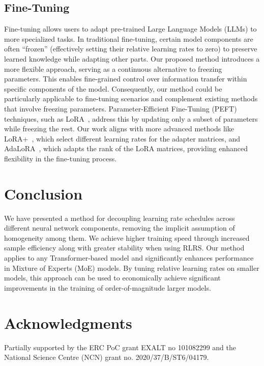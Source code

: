 \documentclass{article} %
\newcommand{\jl}[1]{\textcolor{green}{[JL: #1]}}
\begin{document}
    \subsection{Fine-Tuning}
    Fine-tuning allows users to adapt pre-trained Large Language Models (LLMs) to more specialized tasks. In traditional fine-tuning, certain model components are often ``frozen'' (effectively setting their relative learning rates to zero) to preserve learned knowledge while adapting other parts. Our proposed method introduces a more flexible approach, serving as a continuous alternative to freezing parameters. This enables fine-grained control over information transfer within specific components of the model. Consequently, our method could be particularly applicable to fine-tuning scenarios and complement existing methods that involve freezing parameters. Parameter-Efficient Fine-Tuning (PEFT) techniques, such as LoRA~\citep{hu2021lora}, address this by updating only a subset of parameters while freezing the rest. Our work aligns with more advanced methods like LoRA+~\citep{hayou2024lora+}, which select different learning rates for the adapter matrices, and AdaLoRA~\citep{zhang2023adalora}, which adapts the rank of the LoRA matrices, providing enhanced flexibility in the fine-tuning process.


    \section{Conclusion}

    We have presented a method for decoupling learning rate schedules across different neural network components, removing the implicit assumption of homogeneity among them. We achieve higher training speed through increased sample efficiency along with greater stability when using RLRS.
    Our method applies to any Transformer-based model and significantly enhances performance in Mixture of Experts (MoE) models. By tuning relative learning rates on smaller models, this approach can be used to economically achieve significant improvements in the training of order-of-magnitude larger models. 

    \section*{Acknowledgments}
    Partially supported by the ERC PoC grant EXALT no 101082299 and the National Science Centre (NCN) grant no. 2020/37/B/ST6/04179.
\end{document}
